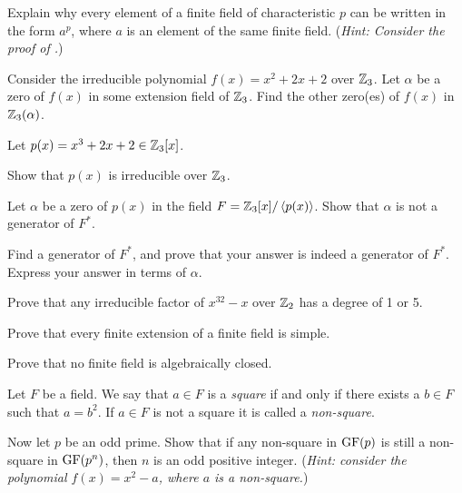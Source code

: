 \begin{problem}
    Explain why every element of a finite field of characteristic $p$ can be written in the form $a^p$, where $a$ is an element of the same finite field.\newline
    (\textit{Hint: Consider the proof of .})
\end{problem}

\begin{problem}
    Consider the irreducible polynomial $f(x) = x^2 + 2x + 2$ over $\mathbb{Z}_3$. Let $\alpha$ be a zero of $f(x)$ in some extension field of $\mathbb{Z}_3$. Find the other zero(es) of $f(x)$ in $\mathbb{Z}_3(\alpha)$.
\end{problem}

\begin{problem}\label{problem-zero-of-irreducible-in-finite-field-is-not-generator}
    Let $p(x) = x^3 + 2x + 2 \in \mathbb{Z}_3[x]$.
    \begin{partquestions}{\roman*}
        \item Show that $p(x)$ is irreducible over $\mathbb{Z}_3$.
        \item Let $\alpha$ be a zero of $p(x)$ in the field $F = \mathbb{Z}_3[x]/\left\langle p(x)\right\rangle$. Show that $\alpha$ is not a generator of $F^\ast$.
        \item Find a generator of $F^\ast$, and prove that your answer is indeed a generator of $F^\ast$. Express your answer in terms of $\alpha$.
    \end{partquestions}
\end{problem}

\begin{problem}
    Prove that any irreducible factor of $x^{32} - x$ over $\mathbb{Z}_2$ has a degree of 1 or 5.
\end{problem}

\begin{problem}
    Prove that every finite extension of a finite field is simple.
\end{problem}

\begin{problem}
    Prove that no finite field is algebraically closed.
\end{problem}

\begin{problem}
    Let $F$ be a field. We say that $a \in F$ is a \textit{square} if and only if there exists a $b \in F$ such that $a = b^2$. If $a \in F$ is not a square it is called a \textit{non-square}.

    Now let $p$ be an odd prime. Show that if any non-square in $\mathrm{GF}(p)$ is still a non-square in $\mathrm{GF}(p^n)$, then $n$ is an odd positive integer.\newline
    (\textit{Hint: consider the polynomial $f(x) = x^2-a$, where $a$ is a non-square.})
\end{problem}
